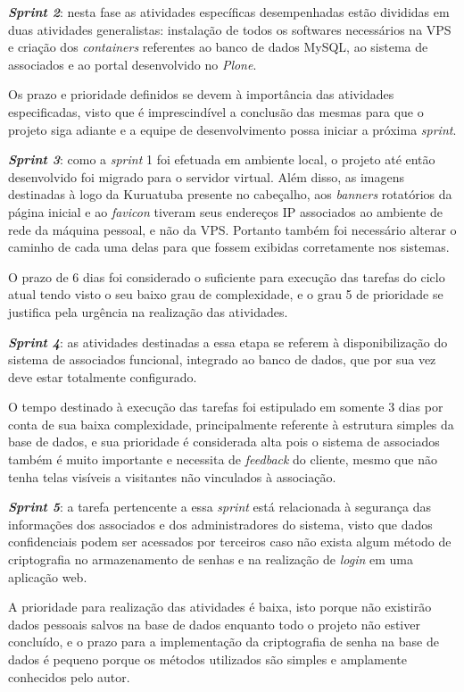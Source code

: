 \textbf{\textit{Sprint 2}}: nesta fase as atividades específicas desempenhadas estão divididas em duas atividades generalistas: instalação de todos os softwares necessários na VPS e criação dos \textit{containers} referentes ao banco de dados MySQL, ao sistema de associados e ao portal desenvolvido no \textit{Plone}. 

Os prazo e prioridade definidos se devem à importância das atividades especificadas, visto que é imprescindível a conclusão das mesmas para que o projeto siga adiante e a equipe de desenvolvimento possa iniciar a próxima \textit{sprint}. 

\textbf{\textit{Sprint 3}}: como a \textit{sprint} 1 foi efetuada em ambiente local, o projeto até então desenvolvido foi migrado para o servidor virtual. Além disso, as imagens destinadas à logo da Kuruatuba presente no cabeçalho, aos \textit{banners} rotatórios da página inicial e ao \textit{favicon} tiveram seus endereços IP associados ao ambiente de rede da máquina pessoal, e não da VPS. Portanto também foi necessário alterar o caminho de cada uma delas para que fossem exibidas corretamente nos sistemas.

O prazo de 6 dias foi considerado o suficiente para execução das tarefas do ciclo atual tendo visto o seu baixo grau de complexidade, e o grau 5 de prioridade se justifica pela urgência na realização das atividades. 

\textbf{\textit{Sprint 4}}: as atividades destinadas a essa etapa se referem à disponibilização do sistema de associados funcional, integrado ao banco de dados, que por sua vez deve estar totalmente configurado. 

O tempo destinado à execução das tarefas foi estipulado em somente 3 dias por conta de sua baixa complexidade, principalmente referente à estrutura simples da base de dados, e sua prioridade é considerada alta pois o sistema de associados também é muito importante e necessita de \textit{feedback} do cliente, mesmo que não tenha telas visíveis a visitantes não vinculados à associação. 

\textbf{\textit{Sprint 5}}: a tarefa pertencente a essa \textit{sprint} está relacionada à segurança das informações dos associados e dos administradores do sistema, visto que dados confidenciais podem ser acessados por terceiros caso não exista algum método de criptografia no armazenamento de senhas e na realização de \textit{login} em uma aplicação web.

A prioridade para realização das atividades é baixa, isto porque não existirão dados pessoais salvos na base de dados enquanto todo o projeto não estiver concluído, e o prazo para a implementação da criptografia de senha na base de dados é pequeno porque os métodos utilizados são simples e amplamente conhecidos pelo autor.

